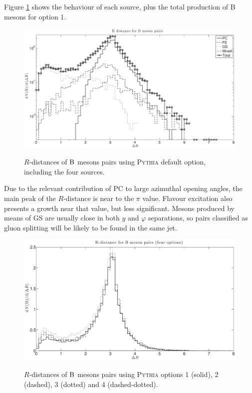 \documentclass[a4paper,12pt]{article}
\begin{document}
Figure \ref{fig:BBROp1} shows the behaviour of each source, plus the total production of B mesons for option 1. 
\begin{figure}[!h]
\centering
\caption[$\B$ meson pairs $R$ distances. \textsc{Pythia} default option.]{$R$-distances of $\B$ mesons pairs using \textsc{Pythia} default option, including the four sources.}
\includegraphics[width=15cm]{BBROp1.eps}
\label{fig:BBROp1}
\end{figure}
Due to the relevant contribution of PC to large azimuthal opening angles, the main peak of the $R$-distance is near to the $\pi$ value. Flavour excitation also presents a growth near that value, but less significant. Mesons produced by means of GS are usually close in both $y$ and $\varphi$ separations, so pairs classified as gluon splitting will be likely to be found in the same jet. 

\begin{figure}[!h]
\centering
\caption[$\B$ meson pairs $R$ distances. Four \textsc{Pythia} options.]{$R$-distances of $\B$ mesons pairs using \textsc{Pythia} options 1 (solid), 2 (dashed), 3 (dotted) and 4 (dashed-dotted).}
\includegraphics[width=15cm]{BBR4Op.eps}
\label{fig:BBR4Op}
\end{figure}
\end{document}

